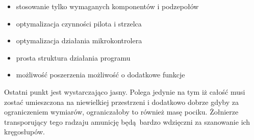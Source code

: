 \begin{itemize}
  \item stosowanie tylko wymaganych komponentów i podzepołów  
  \item optymalizacja czynności pilota i strzelca
  \item optymalizacja działania mikrokontrolera
  \item prosta struktura działania programu
  \item możliwość poszerzenia możliwość o dodatkowe funkcje
\end{itemize}

Ostatni punkt jest wystarczająco jasny. Polega jedynie na tym iż całość musi zostać umieszczona na niewielkiej przestrzeni i dodatkowo dobrze gdyby za ograniczeniem wymiarów, ograniczałoby to również masę pociku. Żołnierze transporujący tego radzaju amunicję będą bardzo wdzięczni za szanowanie ich kręgosłupów.
